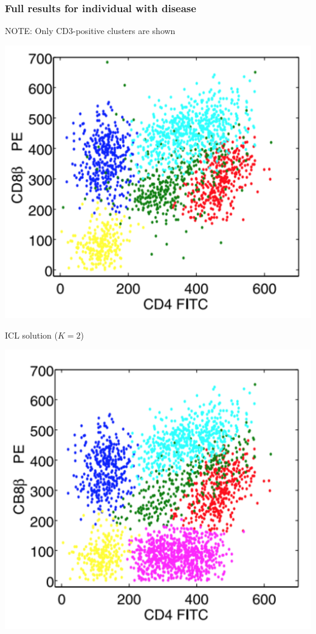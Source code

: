 \documentclass[mathserif,compress]{beamer}
\renewcommand\;{\,}
\begin{document}
\begin{frame}\frametitle{Full results for individual with disease}
\alert{NOTE}: Only CD3-positive clusters are shown
\begin{center}
\begin{minipage}{0.3\linewidth}
\includegraphics[width=\linewidth]{ICL_positive.png}
\begin{center}
ICL solution ($K = 2$)
\end{center}
\end{minipage}
\hfill
\begin{minipage}{0.3\linewidth}
\includegraphics[width=\linewidth]{BIC_positive.png}

\end{minipage}
\end{center}
\end{frame}
\end{document}
